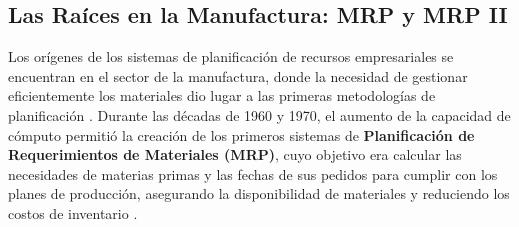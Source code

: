 \documentclass[12pt,letterpaper,spanish]{report}
\begin{document}
\subsection{Las Raíces en la Manufactura: MRP y MRP II}
%
%

Los orígenes de los sistemas de planificación de recursos empresariales se encuentran en el sector de la manufactura, donde la necesidad de gestionar eficientemente los materiales dio lugar a las primeras metodologías de planificación \citep{book,Miño-Cascante_Saumell-Fonseca_Toledo-Borrego_Roldan-Ruenes_Moreno-García_2015}. Durante las décadas de 1960 y 1970, el aumento de la capacidad de cómputo permitió la creación de los primeros sistemas de \textbf{Planificación de Requerimientos de Materiales (MRP)}, cuyo objetivo era calcular las necesidades de materias primas y las fechas de sus pedidos para cumplir con los planes de producción, asegurando la disponibilidad de materiales y reduciendo los costos de inventario \citep{book}.
\end{document}
